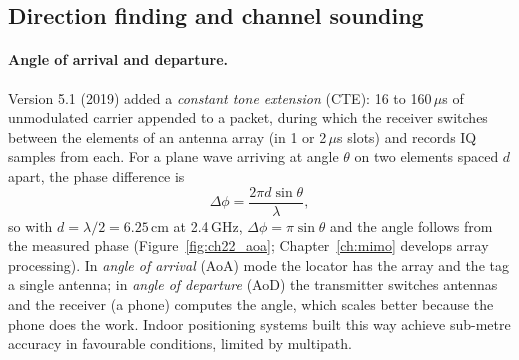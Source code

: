 
\subsection{Direction finding and channel sounding}

\paragraph{Angle of arrival and departure.} Version 5.1 (2019) added a \emph{constant tone extension}
(CTE): 16 to 160\,$\mu$s of unmodulated carrier appended to a packet, during which the receiver
switches between the elements of an antenna array (in 1 or 2\,$\mu$s slots) and records IQ samples
from each. For a plane wave arriving at angle $\theta$ on two elements spaced $d$ apart, the phase
difference is
\begin{equation}
\Delta\phi=\frac{2\pi d\sin\theta}{\lambda},
\label{eq:ch22:aoa}
\end{equation}
so with $d=\lambda/2=6.25$\,cm at 2.4\,GHz, $\Delta\phi=\pi\sin\theta$ and the angle follows from the
measured phase (Figure~\ref{fig:ch22_aoa}; Chapter~\ref{ch:mimo} develops array processing). In
\emph{angle of arrival} (AoA) mode the locator has the array and the tag a single antenna; in
\emph{angle of departure} (AoD) the transmitter switches antennas and the receiver (a phone) computes
the angle, which scales better because the phone does the work. Indoor positioning systems built
this way achieve sub-metre accuracy in favourable conditions, limited by multipath.


